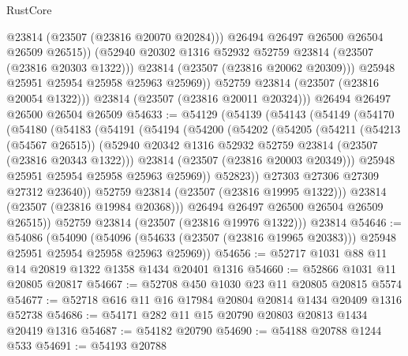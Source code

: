 \begin{lexlean}{RustCore}
\begin{coremodule}
                    @23814
                    (@23507 (@23816 @20070 @20284)))
                  @26494
                  @26497
                  @26500
                  @26504
                  @26509
                  @26515))
              (@52940 @20302 @1316 @52932 @52759 @23814 (@23507 (@23816 @20303 @1322)))
              @23814
              (@23507 (@23816 @20062 @20309)))
            @25948
            @25951
            @25954
            @25958
            @25963
            @25969))
        @52759
        @23814
        (@23507 (@23816 @20054 @1322)))
      @23814
      (@23507 (@23816 @20011 @20324)))
    @26494
    @26497
    @26500
    @26504
    @26509
@54633 := @54129
    (@54139
      (@54143
        (@54149
          (@54170
            (@54180
              (@54183
                (@54191
                  (@54194
                    (@54200
                      (@54202
                        (@54205
                          (@54211
                            (@54213 (@54567 @26515))
                            (@52940
                              @20342
                              @1316
                              @52932
                              @52759
                              @23814
                              (@23507 (@23816 @20343 @1322)))
                            @23814
                            (@23507 (@23816 @20003 @20349)))
                          @25948
                          @25951
                          @25954
                          @25958
                          @25963
                          @25969))
                      @52823))
                  @27303
                  @27306
                  @27309
                  @27312
                  @23640))
              @52759
              @23814
              (@23507 (@23816 @19995 @1322)))
            @23814
            (@23507 (@23816 @19984 @20368)))
          @26494
          @26497
          @26500
          @26504
          @26509
          @26515))
      @52759
      @23814
      (@23507 (@23816 @19976 @1322)))
    @23814
@54646 := @54086
    (@54090
      (@54096 (@54633 (@23507 (@23816 @19965 @20383))) @25948 @25951 @25954 @25958 @25963 @25969))
@54656 := @52717 @1031 @88 @11 @14 @20819 @1322 @1358 @1434 @20401 @1316
@54660 := @52866 @1031 @11 @20805 @20817
@54667 := @52708 @450 @1030 @23 @11 @20805 @20815 @5574
@54677 := @52718 @616 @11 @16 @17984 @20804 @20814 @1434 @20409 @1316 @52738
@54686 := @54171 @282 @11 @15 @20790 @20803 @20813 @1434 @20419 @1316
@54687 := @54182 @20790
@54690 := @54188 @20788 @1244 @533
@54691 := @54193 @20788

\end{coremodule}
\end{lexlean}
